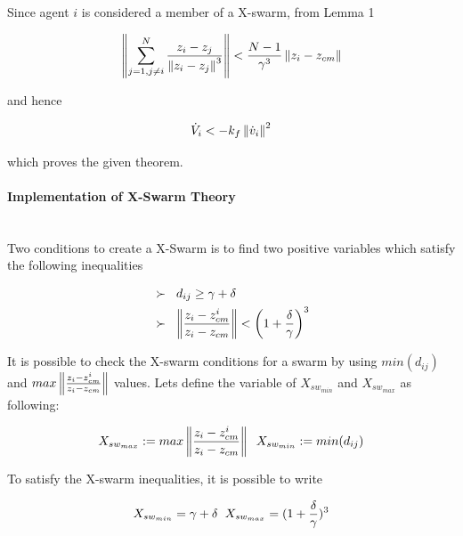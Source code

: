 Since agent $i$ is considered a member of a X-swarm, from Lemma 1

\begin{equation}
\left\lVert \sum_{j=1, j \neq i}^{N} \frac{z_i - z_j}{\left\lVert z_i - z_j\right\rVert^3}\right\rVert < \frac{N-1}{\gamma^3} \left\lVert z_i - z_{cm}\right\rVert
\end{equation}

and hence

\begin{equation}
\dot{V}_i < -k_f \left\lVert\dot{v}_i\right\rVert ^2
\end{equation}

which proves the given theorem.  \newline

\paragraph{Implementation of X-Swarm Theory}\hspace{0pt} \\		
Two conditions to create a X-Swarm is to find two positive variables which satisfy the following inequalities

\begin{align}
\begin{split}
&\succ\hspace{0.2cm}  d_{ij} \geq \gamma + \delta \\
&\succ \hspace{0.2cm}   \left\lVert\frac{z_i - z_{cm}^i}{z_i - z_{cm}}\right\rVert < \left(1+\frac{\delta}{\gamma}\right)^3
\end{split}
\end{align}
		
It is possible to check the X-swarm conditions for a swarm  by using $min(d_{ij})$ and $max \left\lVert\frac{z_i - z_{cm}^i}{z_i - z_{cm}}\right\rVert $ values. Lets define the variable  of $X_{sw_{min}}$ and $X_{sw_{max}}$ as following:

\begin{equation}
X_{sw_{max}} := max \left\lVert\frac{z_i - z_{cm}^i}{z_i - z_{cm}}\right\rVert  \hspace{0.2cm} X_{sw_{min}} := min(d_{ij})
\end{equation}

To satisfy the X-swarm inequalities, it is possible to write 

\begin{equation}
 X_{sw_{min}} = \gamma + \delta  \hspace{0.2cm} X_{sw_{max}} = (1 + \frac{\delta}{\gamma})^3
\end{equation}

